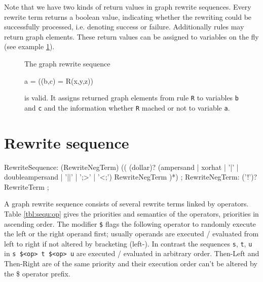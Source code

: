 Note that we have two kinds of return values in graph rewrite sequences.
Every rewrite term returns a boolean value, indicating whether the rewriting could be successfully processed, i.e. denoting success or failure.
Additionally rules may return graph elements.
These return values can be assigned to variables on the fly (see example \ref{ex:grsreturn}).
\begin{figure}[htbp]
\begin{example}
	\label{ex:grsreturn}
	The graph rewrite sequence
	\begin{grgen}	 
a = ((b,c) = R(x,y,z))
	\end{grgen}
	is valid. 
	It assigns returned graph elements from rule \texttt{R} to variables \texttt{b} and \texttt{c} and the information whether \texttt{R} mached or not to variable \texttt{a}.
\end{example}
\end{figure}


\section{Rewrite sequence}

\makeatletter

\begin{rail}
  RewriteSequence: 
    (RewriteNegTerm) (( (dollar)? (ampersand | xorhat | '|' | doubleampersand | '||' | ';>' | '<;') RewriteNegTerm )*)
	;
  RewriteNegTerm: 
    ('!')? RewriteTerm
	;
\end{rail}

A graph rewrite sequence consists of several rewrite terms linked by operators.
Table \ref{tbl:sequ:op} gives the priorities and semantics of the operators, priorities in ascending order.
The modifier \texttt{\$} flags the following operator to randomly execute the left or the right operand first; usually operands are executed / evaluated from left to right if not altered by bracketing (left-). 
In contrast the sequences \texttt{s}, \texttt{t}, \texttt{u} in \texttt{s \$<op> t \$<op> u} are executed / evaluated in arbitrary order.
Then-Left and Then-Right are of the same priority and their execution order can't be altered by the \$ operator prefix.

